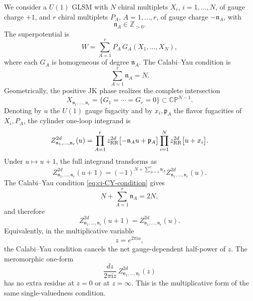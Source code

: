\documentclass[11pt,a4paper]{article}
\numberwithin{equation}{section}
\theoremstyle{plain}
\theoremstyle{definition}
\theoremstyle{remark}
\newcommand{\ii}{\mathrm{i}}
\begin{document}
We consider a \(U(1)\) GLSM with \(N\) chiral multiplets \(X_i\), \(i=1,\ldots,N\), of gauge charge \(+1\), and \(r\) chiral multiplets \(P_A\), \(A=1,\ldots,r\), of gauge charge \(-\mathfrak n_A\), with
\begin{equation}
\mathfrak n_A\in\mathbb Z_{>0}.
\end{equation}
The superpotential is
\begin{equation}
W=\sum_{A=1}^{r}P_A\,G_A(X_1,\ldots,X_N),
\end{equation}
where each \(G_A\) is homogeneous of degree \(\mathfrak n_A\). The Calabi--Yau condition is
\begin{equation}
\sum_{A=1}^{r}\mathfrak n_A=N.
\label{eq:ci-CY-condition}
\end{equation}
Geometrically, the positive JK phase realizes the complete intersection
\begin{equation}
X_{\mathfrak n_1,\ldots,\mathfrak n_r}
=
\{G_1=\cdots=G_r=0\}
\subset \mathbb{CP}^{N-1}.
\end{equation}
Denoting by \(u\) the \(U(1)\) gauge fugacity and by \(x_i,\mathfrak p_A\) the flavor fugacities of \(X_i,P_A\), the cylinder one-loop integrand is
\begin{equation}
Z_{\mathfrak n_1,\ldots,\mathfrak n_r}^{2d}(u)
=
\prod_{A=1}^{r}
z_{\rm RR}^{2d}\bigl[-\mathfrak n_Au+\mathfrak p_A\bigr]
\prod_{i=1}^{N}
z_{\rm RR}^{2d}\bigl[u+x_i\bigr].
\label{eq:ci-integrand}
\end{equation}
Under \(u\mapsto u+1\), the full integrand transforms as
\begin{equation}
Z_{\mathfrak n_1,\ldots,\mathfrak n_r}^{2d}(u+1)
=
(-1)^{N+\sum_{A=1}^{r}\mathfrak n_A}
Z_{\mathfrak n_1,\ldots,\mathfrak n_r}^{2d}(u).
\end{equation}
The Calabi--Yau condition \eqref{eq:ci-CY-condition} gives
\begin{equation}
N+\sum_{A=1}^{r}\mathfrak n_A=2N,
\end{equation}
and therefore
\begin{equation}
Z_{\mathfrak n_1,\ldots,\mathfrak n_r}^{2d}(u+1)=Z_{\mathfrak n_1,\ldots,\mathfrak n_r}^{2d}(u).
\end{equation}
Equivalently, in the multiplicative variable
\begin{equation}
z=e^{2\pi \ii u},
\end{equation}
the Calabi--Yau condition cancels the net gauge-dependent half-power of \(z\). The meromorphic one-form
\begin{equation}
\frac{dz}{2\pi \ii z}\,Z_{\mathfrak n_1,\ldots,\mathfrak n_r}^{2d}(z)
\end{equation}
has no extra residue at \(z=0\) or at \(z=\infty\). This is the multiplicative form of the same single-valuedness condition.
\end{document}
